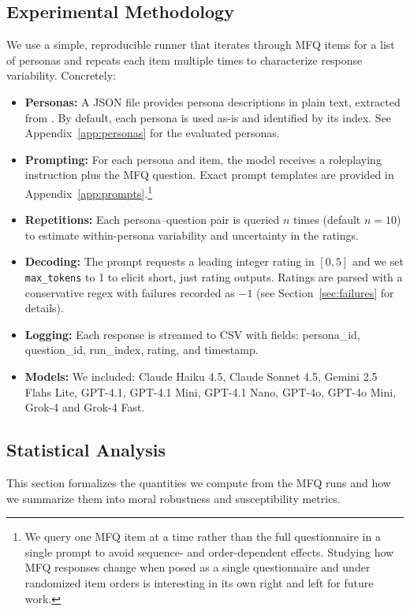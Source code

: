 \documentclass{article}
\begin{document}
\subsection{Experimental Methodology}
We use a simple, reproducible runner that iterates through MFQ items for a list of personas and repeats each item multiple times to characterize response variability. Concretely:
\begin{itemize}
  \item \textbf{Personas:} A JSON file provides persona descriptions in plain text, extracted from \citep{ge2025scalingsyntheticdatacreation}. By default, each persona is used as-is and identified by its index. See Appendix~\ref{app:personas} for the evaluated personas.
  \item \textbf{Prompting:} For each persona and item, the model receives a roleplaying instruction plus the MFQ question. Exact prompt templates are provided in Appendix~\ref{app:prompts}.\footnote{We query one MFQ item at a time rather than the full questionnaire in a single prompt to avoid sequence- and order-dependent effects. Studying how MFQ responses change when posed as a single questionnaire and under randomized item orders is interesting in its own right and left for future work.}
  \item \textbf{Repetitions:} Each persona--question pair is queried \(n\) times (default \(n=10\)) to estimate within-persona variability and uncertainty in the ratings.
  \item \textbf{Decoding:}  The prompt requests a leading integer rating in \([0,5]\) and we set \texttt{max\_tokens} to 1 to elicit short, just rating outputs. Ratings are parsed with a conservative regex with failures recorded as \(-1\) (see Section~\ref{sec:failures} for details).
  \item \textbf{Logging:} Each response is streamed to CSV with fields: persona\_id, question\_id, run\_index, rating, and timestamp.
  \item \textbf{Models:} We included: Claude Haiku 4.5, Claude Sonnet 4.5, Gemini 2.5 Flahs Lite, GPT-4.1, GPT-4.1 Mini, GPT-4.1 Nano, GPT-4o, GPT-4o Mini, Grok-4 and Grok-4 Fast.
\end{itemize}


\subsection{Statistical Analysis}



This section formalizes the quantities we compute from the MFQ runs and how we summarize them into moral robustness and susceptibility metrics.
\end{document}
